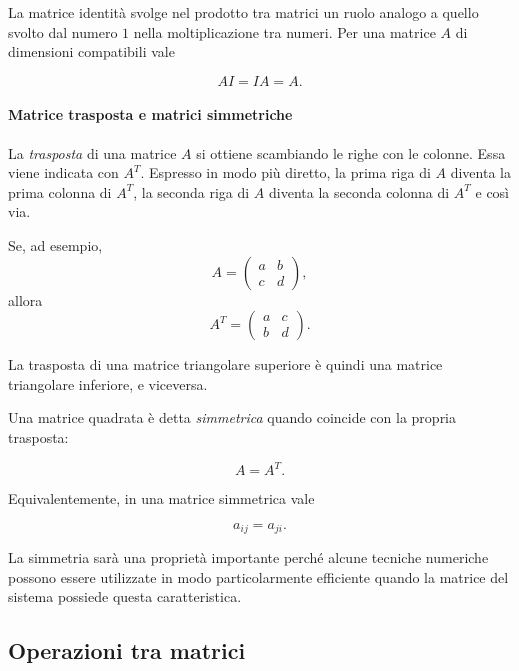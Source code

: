 La matrice identità svolge nel prodotto tra matrici un ruolo
analogo a quello svolto dal numero $1$ nella moltiplicazione
tra numeri. Per una matrice $A$ di dimensioni compatibili vale

\begin{equation*}
AI=IA=A.
\end{equation*}


\paragraph{Matrice trasposta e matrici simmetriche}

La \emph{trasposta} di una matrice $A$ si ottiene scambiando
le righe con le colonne. Essa viene indicata con $A^T$. Espresso in modo più diretto, la prima riga di $A$ diventa la prima colonna di $A^T$, la seconda riga di $A$ diventa la seconda colonna di $A^T$ e così via. 

Se, ad esempio,
\begin{equation*}
A =
\begin{pmatrix}
a & b \\
c & d
\end{pmatrix},
\end{equation*}
allora
\begin{equation*}
A^T =
\begin{pmatrix}
a & c \\
b & d
\end{pmatrix}.
\end{equation*}

La trasposta di una matrice triangolare superiore è quindi una
matrice triangolare inferiore, e viceversa.

Una matrice quadrata è detta \emph{simmetrica} quando coincide
con la propria trasposta:

\begin{equation*}
A=A^T.
\end{equation*}

Equivalentemente, in una matrice simmetrica vale

\begin{equation*}
a_{ij}=a_{ji}.
\end{equation*}

La simmetria sarà una proprietà importante perché alcune tecniche
numeriche possono essere utilizzate in modo particolarmente
efficiente quando la matrice del sistema possiede questa
caratteristica.


\subsection{Operazioni tra matrici}


